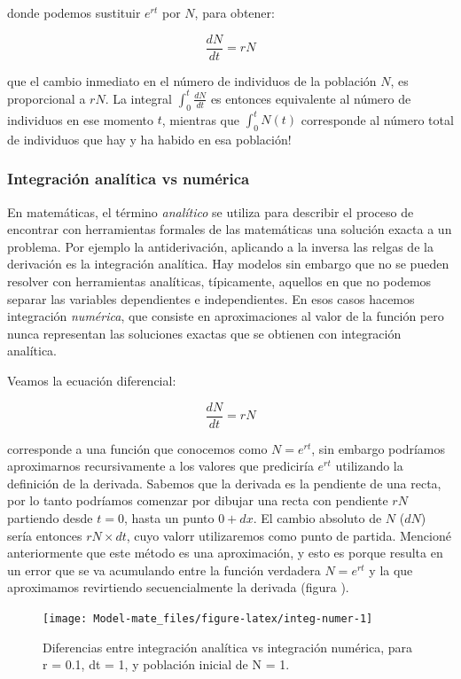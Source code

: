 \documentclass[
]{book}
\begin{document}
donde podemos sustituir \(e^{rt}\) por \(N\), para obtener:

\begin{equation}
\frac{dN}{dt} = r N
\end{equation}

que el cambio inmediato en el número de individuos de la población \(N\), es proporcional a \(rN\). La integral \(\int_{0}^{t} \frac{dN}{dt}\) es entonces equivalente al número de individuos en ese momento \(t\), mientras que \(\int_{0}^{t} N(t)\) corresponde al número total de individuos que hay y ha habido en esa población!

\hypertarget{integraciuxf3n-analuxedtica-vs-numuxe9rica}{%
\subsubsection{Integración analítica vs numérica}\label{integraciuxf3n-analuxedtica-vs-numuxe9rica}}

En matemáticas, el término \emph{analítico} se utiliza para describir el proceso de encontrar con herramientas formales de las matemáticas una solución exacta a un problema. Por ejemplo la antiderivación, aplicando a la inversa las relgas de la derivación es la integración analítica. Hay modelos sin embargo que no se pueden resolver con herramientas analíticas, típicamente, aquellos en que no podemos separar las variables dependientes e independientes. En esos casos hacemos integración \emph{numérica}, que consiste en aproximaciones al valor de la función pero nunca representan las soluciones exactas que se obtienen con integración analítica.

Veamos la ecuación diferencial:

\begin{equation}
\frac{dN}{dt} = rN \label{eq:dif-1}
\end{equation}

corresponde a una función que conocemos como \(N = e^{rt}\), sin embargo podríamos aproximarnos recursivamente a los valores que prediciría \(e^{rt}\) utilizando la definición de la derivada. Sabemos que la derivada es la pendiente de una recta, por lo tanto podríamos comenzar por dibujar una recta con pendiente \(rN\) partiendo desde \(t = 0\), hasta un punto \(0+dx\). El cambio absoluto de \(N\) (\(dN\)) sería entonces \(rN \times dt\), cuyo valorr utilizaremos como punto de partida. Mencioné anteriormente que este método es una aproximación, y esto es porque resulta en un error que se va acumulando entre la función verdadera \(N = e^{rt}\) y la que aproximamos revirtiendo secuencialmente la derivada (figura ).

\begin{figure}

{\centering \texttt{[image: Model-mate\_files/figure-latex/integ-numer-1]} 

}

\caption{Diferencias entre integración analítica vs integración numérica, para r = 0.1, dt = 1, y población inicial de N = 1.}\label{fig:integ-numer}
\end{figure}

  
\end{document}
